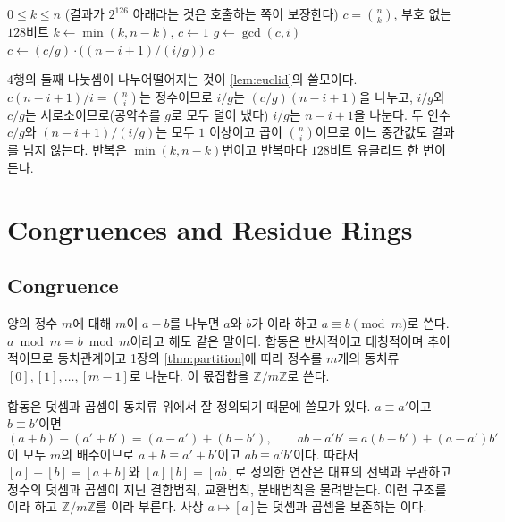 \begin{algorithm}[htbp]
\begin{algorithmic}[1]
\Require $0\le k\le n$ (결과가 $2^{126}$ 아래라는 것은 호출하는 쪽이 보장한다)
\Ensure $c=\binom{n}{k}$, 부호 없는 $128$비트
\State $k\gets\min(k,n-k)$, $c\gets1$
 
  \State $g\gets\gcd(c,i)$ 
  \State $c\gets(c/g)\cdot\bigl((n-i+1)/(i/g)\bigr)$ 
\EndFor
\State \Return $c$
\end{algorithmic}
\caption{넘치지 않는 정확한 이항계수 (stardust )}
\label{alg:binom}
\end{algorithm}

4행의 둘째 나눗셈이 나누어떨어지는 것이 \cref{lem:euclid}의 쓸모이다. $c(n-i+1)/i=\binom{n}{i}$는 정수이므로 $i/g$는 $(c/g)(n-i+1)$을 나누고, $i/g$와 $c/g$는 서로소이므로(공약수를 $g$로 모두 덜어 냈다) $i/g$는 $n-i+1$을 나눈다. 두 인수 $c/g$와 $(n-i+1)/(i/g)$는 모두 $1$ 이상이고 곱이 $\binom{n}{i}$이므로 어느 중간값도 결과를 넘지 않는다. 반복은 $\min(k,n-k)$번이고 반복마다 $128$비트 유클리드 한 번이 든다.


\section{Congruences and Residue Rings}
\label{sec:congruence}

\subsection{Congruence}

양의 정수 $m$에 대해 $m$이 $a-b$를 나누면 $a$와 $b$가 이라 하고 $a\equiv b\pmod m$로 쓴다. $a\bmod m=b\bmod m$이라고 해도 같은 말이다. 합동은 반사적이고 대칭적이며 추이적이므로 동치관계이고 1장의 \cref{thm:partition}에 따라 정수를 $m$개의 동치류 $[0],[1],\dots,[m-1]$로 나눈다. 이 몫집합을 $\mathbb{Z}/m\mathbb{Z}$로 쓴다.

합동은 덧셈과 곱셈이 동치류 위에서 잘 정의되기 때문에 쓸모가 있다. $a\equiv a'$이고 $b\equiv b'$이면
\[
(a+b)-(a'+b')=(a-a')+(b-b'),\qquad ab-a'b'=a(b-b')+(a-a')b'
\]
이 모두 $m$의 배수이므로 $a+b\equiv a'+b'$이고 $ab\equiv a'b'$이다. 따라서 $[a]+[b]=[a+b]$와 $[a][b]=[ab]$로 정의한 연산은 대표의 선택과 무관하고 정수의 덧셈과 곱셈이 지닌 결합법칙, 교환법칙, 분배법칙을 물려받는다. 이런 구조를 이라 하고 $\mathbb{Z}/m\mathbb{Z}$를 이라 부른다. 사상 $a\mapsto[a]$는 덧셈과 곱셈을 보존하는 이다.

